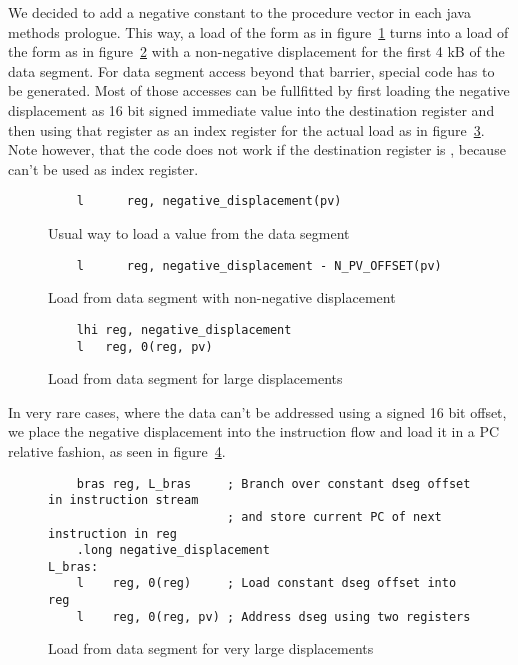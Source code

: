 We decided to add a negative constant  to the procedure vector in each java methods prologue. This way, a load of the form as in figure~\ref{s390:fig:dsegload1} turns into a load of the form as in figure~\ref{s390:fig:dsegload2} with a non-negative displacement for the first 4 kB of the data segment. For data segment access beyond that barrier, special code has to be generated. Most of those accesses can be fullfitted by first loading the negative displacement as 16 bit signed immediate value into the destination register and then using that register as an index register for the actual load as in figure~\ref{s390:fig:dsegload3}. Note however, that the code does not work if the destination register is , because  can't be used as index register.

\begin{figure}[H]
\begin{verbatim}
    l      reg, negative_displacement(pv)
\end{verbatim}
\caption{Usual way to load a value from the data segment}
\label{s390:fig:dsegload1}
\end{figure}

\begin{figure}[H]
\begin{verbatim}
    l      reg, negative_displacement - N_PV_OFFSET(pv)
\end{verbatim}
\caption{Load from data segment with non-negative displacement}
\label{s390:fig:dsegload2}
\end{figure}

\begin{figure}[H]
\begin{verbatim}
    lhi reg, negative_displacement
    l   reg, 0(reg, pv)
\end{verbatim}
\caption{Load from data segment for large displacements}
\label{s390:fig:dsegload3}
\end{figure}

In very rare cases, where the data can't be addressed using a signed 16 bit offset, we place the negative displacement into the instruction flow and load it in a PC relative fashion, as seen in figure~\ref{s390:fig:dsegload4}.

\begin{figure}[H]
\begin{verbatim}
    bras reg, L_bras     ; Branch over constant dseg offset in instruction stream 
                         ; and store current PC of next instruction in reg	
    .long negative_displacement
L_bras:
    l    reg, 0(reg)     ; Load constant dseg offset into reg
    l    reg, 0(reg, pv) ; Address dseg using two registers
\end{verbatim}
\caption{Load from data segment for very large displacements}
\label{s390:fig:dsegload4}
\end{figure}


